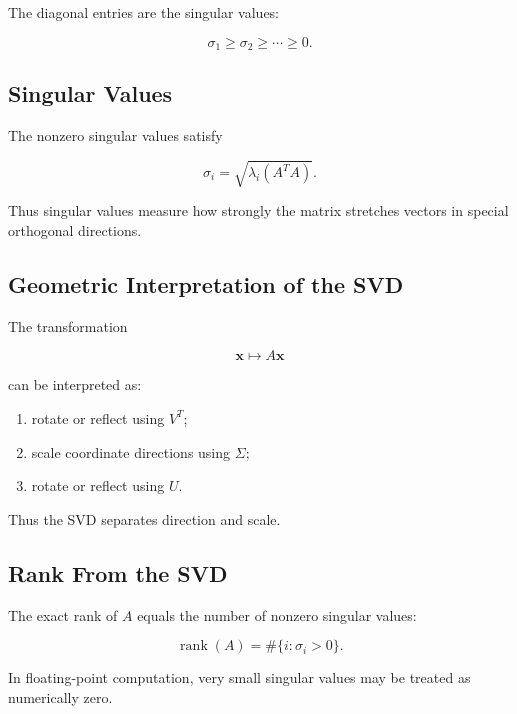 The diagonal entries are the singular values:

\[
\boxed{
\sigma_1
\geq
\sigma_2
\geq
\cdots
\geq
0.
}
\]

\subsection{Singular Values}
\label{subsec:singular-values}

The nonzero singular values satisfy

\[
\boxed{
\sigma_i
=
\sqrt{
\lambda_i(A^TA)
}.
}
\]

Thus singular values measure how strongly the matrix stretches vectors in
special orthogonal directions.

\subsection{Geometric Interpretation of the SVD}
\label{subsec:svd-geometric}

The transformation

\[
\mathbf{x}
\mapsto
A\mathbf{x}
\]

can be interpreted as:

\begin{enumerate}
    \item rotate or reflect using \(V^T\);
    \item scale coordinate directions using \(\Sigma\);
    \item rotate or reflect using \(U\).
\end{enumerate}

Thus the SVD separates direction and scale.

\subsection{Rank From the SVD}
\label{subsec:svd-rank}

The exact rank of \(A\) equals the number of nonzero singular values:

\[
\boxed{
\operatorname{rank}(A)
=
\#\{
i:
\sigma_i>0
\}.
}
\]

In floating-point computation, very small singular values may be treated as
numerically zero.

